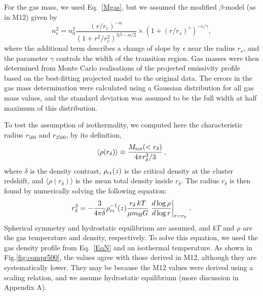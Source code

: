 \documentclass{aa}
\begin{document}
For the
gas mass, we used Eq.~\ref{Mgas}, but we assumed the modified
$\beta$-model (as in M12) given by
\begin{equation}
\label{EqN}
n_{e}^{2}=n_{0}^{2}\frac{(r/r_{c})^{-\alpha}}{(1+r^{2}/r_{c}^{2})^{3\beta-\alpha/2}}\times(1+(r/r_{s})^{\gamma})^{-\epsilon/\gamma},
\end{equation} 
where the additional term describes a change of slope by $\epsilon$
near the radius $r_{s}$, and the parameter $\gamma$ controls the width
of the transition region.
Gas masses were then determined from Monte Carlo realisations of the projected emissivity profile 
based on the best-fitting projected model to the original data. 
The errors in the gas mass determination were calculated using a Gaussian distribution for all gas mass values, and the 
standard deviation was assumed to be the full width at half maximum of this distribution.

To test the assumption of isothermality, we computed here the characteristic radius $r_{500}$ and $r_{2500}$,
by its definition,
\begin{equation}
 \langle \rho(r_\delta) \rangle \equiv \frac{M_{\rm tot}(< r_\delta)}{4 \pi r_\delta^3/3} \, ,
\end{equation}
%
where $\delta$ is the density contrast, $\rho_{\rm cr}(z)$ is the critical density at the cluster redshift, 
and $\langle \rho(r_\delta) \rangle$ is the mean total density inside $r_\delta$. 
The radius $r_\delta$ is then found by numerically solving the following equation:
%
\begin{equation}
r_\delta^3 = - \frac{3}{4 \pi \delta} \rho_{\rm cr}^{-1}(z) 
\frac{r_\delta \, kT}{\mu m_{\rm H} G} \left.\frac{d \log \rho}{d \log r}\right|_{r=r_\delta} \, .
\end{equation}
Spherical symmetry and hydrostatic equilibrium are assumed, and $kT$ and $\rho$ are the 
gas temperature and density, respectively.
To solve this equation, we used the gas density profile from Eq.~\ref{EqN} and an isothermal temperature.
As shown in Fig.\ref{fig:compr500}, the values
agree with those derived in M12, although  they are systematically lower. They 
may be because the M12 values were derived using a scaling relation,
and we assume hydrostatic equilibrium  (more discussion in Appendix A).
\end{document}
